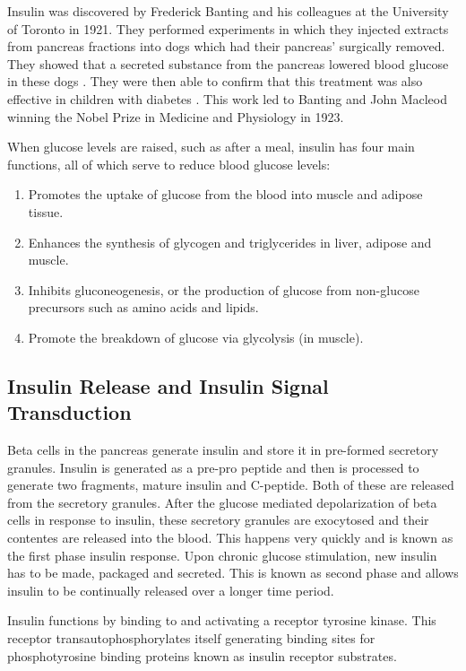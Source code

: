 \documentclass{tufte-handout}
\begin{document}
Insulin was discovered by Frederick Banting and his colleagues at the University of Toronto in 1921.  They performed experiments in which they injected extracts from pancreas fractions into dogs which had their pancreas' surgically removed.  They showed that a secreted substance from the pancreas lowered blood glucose in these dogs \cite{Banting1922}.  They were then able to confirm that this treatment was also effective in children with diabetes \cite{Banting1922a}.  This work led to Banting and John Macleod winning the Nobel Prize in Medicine and Physiology in 1923.

When glucose levels are raised, such as after a meal, insulin has four main functions, all of which serve to reduce blood glucose levels:

\begin{enumerate}
\item Promotes the uptake of glucose from the blood into muscle and adipose tissue.  
\item Enhances the synthesis of glycogen and triglycerides in liver, adipose and muscle.  
\item Inhibits gluconeogenesis, or the production of glucose from non-glucose precursors such as amino acids and lipids.
\item Promote the breakdown of glucose via glycolysis (in muscle).
\end{enumerate}

\subsection{Insulin Release and Insulin Signal Transduction}

Beta cells in the pancreas generate insulin and store it in pre-formed secretory granules.  Insulin is generated as a pre-pro peptide and then is processed to generate two fragments, mature insulin and C-peptide.  Both of these are released from the secretory granules.  After the glucose mediated depolarization of beta cells in response to insulin, these secretory granules are exocytosed and their contentes are released into the blood.  This happens very quickly and is known as the first phase insulin response.  Upon chronic glucose stimulation, new insulin has to be made, packaged and secreted.  This is known as second phase and allows insulin to be continually released over a longer time period.

Insulin functions by binding to and activating a receptor tyrosine kinase.  This receptor transautophosphorylates itself generating binding sites for phosphotyrosine binding proteins known as insulin receptor substrates.
\end{document}
